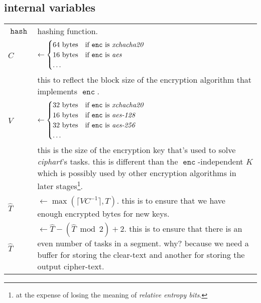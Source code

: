 \documentclass[twocolumn]{article}
\DeclareMathOperator{\enc}{\texttt{enc}}
\DeclareMathOperator{\maxf}{max}
\DeclareMathOperator{\hash}{\texttt{hash}}
\begin{document}
\subsection{internal variables}
\begin{tabularx}{\columnwidth}{lX}
    $\hash$ & hashing function.\\
    $C$         & $\gets \begin{cases}
                        64 \text{ bytes} & \text{if $\enc$ is
                                            \emph{xchacha20}}\\
                        16 \text{ bytes} & \text{if $\enc$ is \emph{aes}}\\
                        \ldots & \\
                     \end{cases}$\\
                & this to reflect the block size of the encryption
                    algorithm that implements $\enc$.\\
    $V$ & $\gets \begin{cases}
                        32 \text{ bytes} & \text{if $\enc$ is
                                            \emph{xchacha20}}\\
                        16 \text{ bytes} & \text{if $\enc$ is
                            \emph{aes-128}}\\
                        32 \text{ bytes} & \text{if $\enc$ is
                            \emph{aes-256}}\\
                        \ldots & \\
                     \end{cases}$\\
                & this is the size of the encryption key that's used to
                    solve \emph{ciphart}'s tasks.  this is different than
                    the $\enc$-independent $K$ which is
                    possibly used by other encryption algorithms in later
                    stages\footnote{at the expense of losing the meaning of
                    \emph{relative entropy bits}.}.\\
    $\hat T$    & $\gets \maxf(\lceil V C^{-1}\rceil, T)$.  this
                    is to ensure that we have enough encrypted bytes for
                    new keys.\\
    $\hat T$    & $\gets \hat T - (\hat T \bmod 2) + 2$.  this is to ensure
                    that there is an even number of tasks in a segment.
                    why?  because we need a buffer for storing the
                    clear-text and another for storing the output
                    cipher-text.\\
\end{tabularx}
\end{document}
